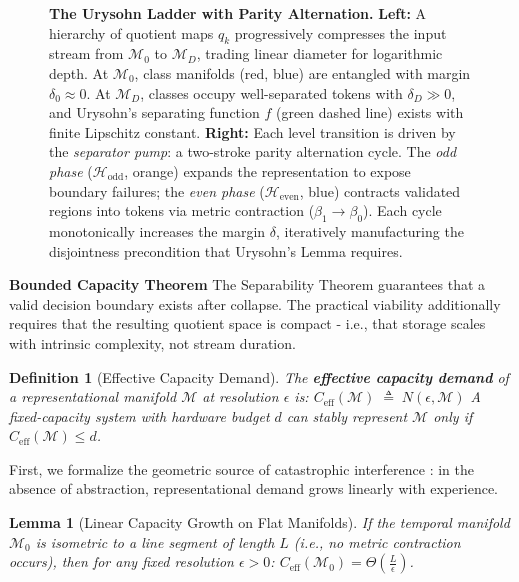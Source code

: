\documentclass{article}
\newcommand{\Heven}{\mathcal{H}_{\text{even}}}
\newcommand{\Hodd}{\mathcal{H}_{\text{odd}}}
\newtheorem{lemma}{Lemma}
\newtheorem{definition}{Definition}
\begin{document}
\begin{figure}[h]
{\begin{tikzpicture}
\end{tikzpicture}
}
\caption{\textbf{The Urysohn Ladder with Parity Alternation.} \textbf{Left:} A hierarchy of quotient maps $q_k$ progressively compresses the input stream from $\mathcal{M}_0$ to $\mathcal{M}_D$, trading linear diameter for logarithmic depth. At $\mathcal{M}_0$, class manifolds (red, blue) are entangled with margin $\delta_0 \approx 0$. At $\mathcal{M}_D$, classes occupy well-separated tokens with $\delta_D \gg 0$, and Urysohn's separating function $f$ (green dashed line) exists with finite Lipschitz constant. \textbf{Right:} Each level transition is driven by the \emph{separator pump}: a two-stroke parity alternation cycle. The \emph{odd phase} ($\Hodd$, orange) expands the representation to expose boundary failures; the \emph{even phase} ($\Heven$, blue) contracts validated regions into tokens via metric contraction ($\beta_1 \to \beta_0$). Each cycle monotonically increases the margin $\delta$, iteratively manufacturing the disjointness precondition that Urysohn's Lemma requires.}
\label{fig:log_scaling}
\end{figure}

\noindent\textbf{Bounded Capacity Theorem}
The Separability Theorem guarantees that a valid decision boundary exists after collapse. The practical viability additionally requires that the resulting quotient space is compact - i.e., that storage scales with intrinsic complexity, not stream duration.
 
 
\begin{definition}[Effective Capacity Demand]
The \textbf{effective capacity demand} of a representational manifold $\mathcal{M}$ at resolution $\epsilon$ is:
$C_{\mathrm{eff}}(\mathcal{M}) \;\triangleq\; N(\epsilon, \mathcal{M})$
A fixed-capacity system with hardware budget $d$ can stably represent $\mathcal{M}$ only if $C_{\mathrm{eff}}(\mathcal{M}) \le d$.
\end{definition}
 
First, we formalize the geometric source of catastrophic interference \cite{mccloskey1989catastrophic}: in the absence of abstraction, representational demand grows linearly with experience.
 
\begin{lemma}[Linear Capacity Growth on Flat Manifolds]
\label{lem:linear_growth}
If the temporal manifold $\mathcal{M}_0$ is isometric to a line segment of length $L$ (i.e., no metric contraction occurs), then for any fixed resolution $\epsilon > 0$:
    $C_{\mathrm{eff}}(\mathcal{M}_0) = \Theta\left(\frac{L}{\epsilon}\right)$.
\end{lemma}
 
\end{document}
